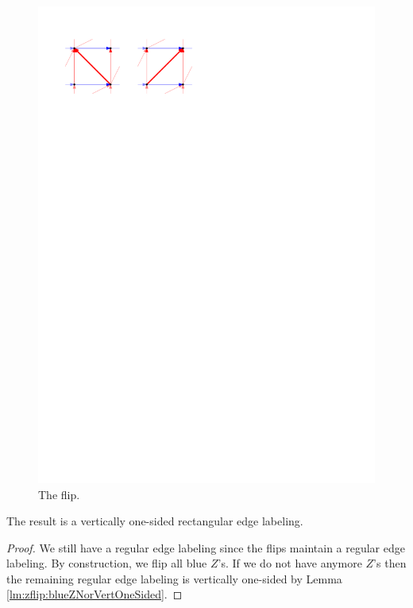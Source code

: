   \begin{figure}[h]
    \centering
    \includegraphics[scale=1]{unifiedAlgo/img/zflip/flip.pdf}
    \caption{The flip.}
    \label{fig:zflip:flip}
  \end{figure}

  \begin{lemma}
    \label{lm:sweep:vertOnsided}
    The result is a vertically one-sided rectangular edge labeling.
  \end{lemma}
  \begin{proof}
    We still have a regular edge labeling since the flips maintain a regular edge labeling.
    By construction, we flip all blue $Z$'s. If we do not have anymore $Z$'s then the remaining regular edge labeling is vertically one-sided by Lemma \ref{lm:zflip:blueZNorVertOneSided}.
  \end{proof}

